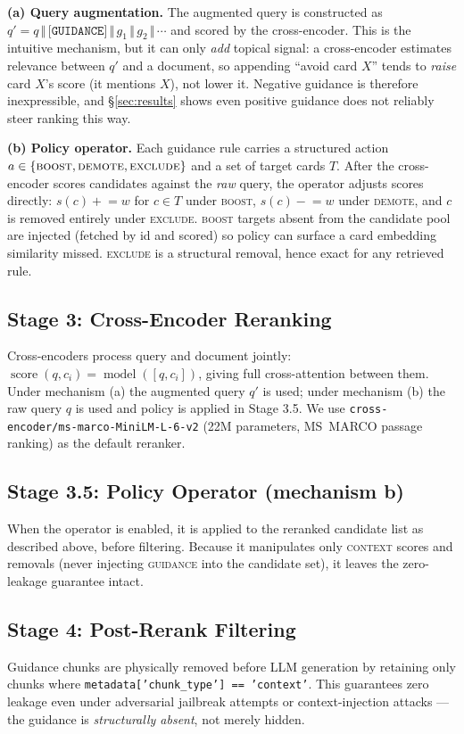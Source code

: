 \documentclass[11pt]{article}
\newcommand{\guidance}{\textsc{guidance}}
\newcommand{\context}{\textsc{context}}
\begin{document}
\textbf{(a) Query augmentation.} The augmented query is constructed as
$q' = q \,\Vert\, \texttt{[GUIDANCE]} \,\Vert\, g_1 \,\Vert\, g_2 \,\Vert\, \cdots$ and scored
by the cross-encoder. This is the intuitive mechanism, but it can only \emph{add} topical
signal: a cross-encoder estimates relevance between $q'$ and a document, so appending ``avoid
card $X$'' tends to \emph{raise} card $X$'s score (it mentions $X$), not lower it. Negative
guidance is therefore inexpressible, and \S\ref{sec:results} shows even positive guidance does
not reliably steer ranking this way.

\textbf{(b) Policy operator.} Each guidance rule carries a structured action
$a \in \{\textsc{boost},\textsc{demote},\textsc{exclude}\}$ and a set of target cards $T$.
After the cross-encoder scores candidates against the \emph{raw} query, the operator adjusts
scores directly: $s(c) \mathrel{+}= w$ for $c \in T$ under \textsc{boost}, $s(c) \mathrel{-}= w$
under \textsc{demote}, and $c$ is removed entirely under \textsc{exclude}. \textsc{boost}
targets absent from the candidate pool are injected (fetched by id and scored) so policy can
surface a card embedding similarity missed. \textsc{exclude} is a structural removal, hence
exact for any retrieved rule.

\subsection{Stage 3: Cross-Encoder Reranking}
Cross-encoders process query and document jointly:
$\operatorname{score}(q, c_i) = \operatorname{model}([q, c_i])$, giving full cross-attention
between them. Under mechanism (a) the augmented query $q'$ is used; under mechanism (b) the raw
query $q$ is used and policy is applied in Stage 3.5. We use
\texttt{cross-encoder/ms-marco-MiniLM-L-6-v2} (22M parameters, MS~MARCO passage ranking) as
the default reranker.

\subsection{Stage 3.5: Policy Operator (mechanism b)}
When the operator is enabled, it is applied to the reranked candidate list as described above,
before filtering. Because it manipulates only \context{} scores and removals (never injecting
\guidance{} into the candidate set), it leaves the zero-leakage guarantee intact.

\subsection{Stage 4: Post-Rerank Filtering}
Guidance chunks are physically removed before LLM generation by retaining only chunks where
\texttt{metadata['chunk\_type'] == 'context'}. This guarantees zero leakage even under
adversarial jailbreak attempts or context-injection attacks --- the guidance is
\emph{structurally absent}, not merely hidden.
\end{document}
